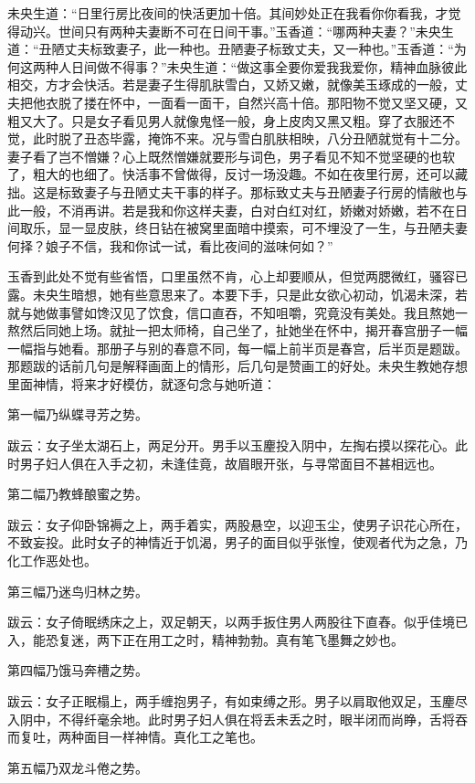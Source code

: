 \documentclass[a4paper,12pt,UTF8,twoside]{ctexbook}
\begin{document}
未央生道：“日里行房比夜间的快活更加十倍。其间妙处正在我看你你看我，才觉得动兴。世间只有两种夫妻断不可在日间干事。”玉香道：“哪两种夫妻？”未央生道：“丑陋丈夫标致妻子，此一种也。丑陋妻子标致丈夫，又一种也。”玉香道：“为何这两种人日间做不得事？”未央生道：“做这事全要你爱我我爱你，精神血脉彼此相交，方才会快活。若是妻子生得肌肤雪白，又娇又嫩，就像美玉琢成的一般，丈夫把他衣脱了搂在怀中，一面看一面干，自然兴高十倍。那阳物不觉又坚又硬，又粗又大了。只是女子看见男人就像鬼怪一般，身上皮肉又黑又粗。穿了衣服还不觉，此时脱了丑态毕露，掩饰不来。况与雪白肌肤相映，八分丑陋就觉有十二分。妻子看了岂不憎嫌？心上既然憎嫌就要形与词色，男子看见不知不觉坚硬的也软了，粗大的也细了。快活事不曾做得，反讨一场没趣。不如在夜里行房，还可以藏拙。这是标致妻子与丑陋丈夫干事的样子。那标致丈夫与丑陋妻子行房的情敝也与此一般，不消再讲。若是我和你这样夫妻，白对白红对红，娇嫩对娇嫩，若不在日间取乐，显一显皮肤，终日钻在被窝里面暗中摸索，可不埋没了一生，与丑陋夫妻何择？娘子不信，我和你试一试，看比夜间的滋味何如？”

玉香到此处不觉有些省悟，口里虽然不肯，心上却要顺从，但觉两腮微红，骚容已露。未央生暗想，她有些意思来了。本要下手，只是此女欲心初动，饥渴未深，若就与她做事譬如馋汉见了饮食，信口直吞，不知咀嚼，究竟没有美处。我且熬她一熬然后同她上场。就扯一把太师椅，自己坐了，扯她坐在怀中，揭开春宫册子一幅一幅指与她看。那册子与别的春意不同，每一幅上前半页是春宫，后半页是题跋。那题跋的话前几句是解释画面上的情形，后几句是赞画工的好处。未央生教她存想里面神情，将来才好模仿，就逐句念与她听道：

第一幅乃纵蝶寻芳之势。

跋云：女子坐太湖石上，两足分开。男手以玉麈投入阴中，左掏右摸以探花心。此时男子妇人俱在入手之初，未逢佳竟，故眉眼开张，与寻常面目不甚相远也。

第二幅乃教蜂酿蜜之势。

跋云：女子仰卧锦褥之上，两手着实，两股悬空，以迎玉尘，使男子识花心所在，不致妄投。此时女子的神情近于饥渴，男子的面目似乎张惶，使观者代为之急，乃化工作恶处也。

第三幅乃迷鸟归林之势。

跋云：女子倚眠绣床之上，双足朝天，以两手扳住男人两股往下直舂。似乎佳境已入，能恐复迷，两下正在用工之时，精神勃勃。真有笔飞墨舞之妙也。

第四幅乃饿马奔槽之势。

跋云：女子正眠榻上，两手缠抱男子，有如束缚之形。男子以肩取他双足，玉麈尽入阴中，不得纤毫余地。此时男子妇人俱在将丢未丢之时，眼半闭而尚睁，舌将吞而复吐，两种面目一样神情。真化工之笔也。

第五幅乃双龙斗倦之势。
\end{document}
